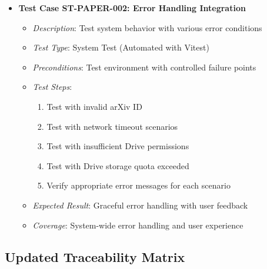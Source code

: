 \documentclass[12pt]{article}
\begin{document}
\begin{itemize}
  \item \textbf{Test Case ST-PAPER-002: Error Handling Integration}
    \begin{itemize}
      \item \textit{Description}: Test system behavior with various error conditions
      \item \textit{Test Type}: System Test (Automated with Vitest)
      \item \textit{Preconditions}: Test environment with controlled failure points
      \item \textit{Test Steps}:
        \begin{enumerate}
          \item Test with invalid arXiv ID
          \item Test with network timeout scenarios
          \item Test with insufficient Drive permissions
          \item Test with Drive storage quota exceeded
          \item Verify appropriate error messages for each scenario
        \end{enumerate}
      \item \textit{Expected Result}: Graceful error handling with user feedback
      \item \textit{Coverage}: System-wide error handling and user experience
    \end{itemize}
\end{itemize}

\subsection{Updated Traceability Matrix}
\end{document}
